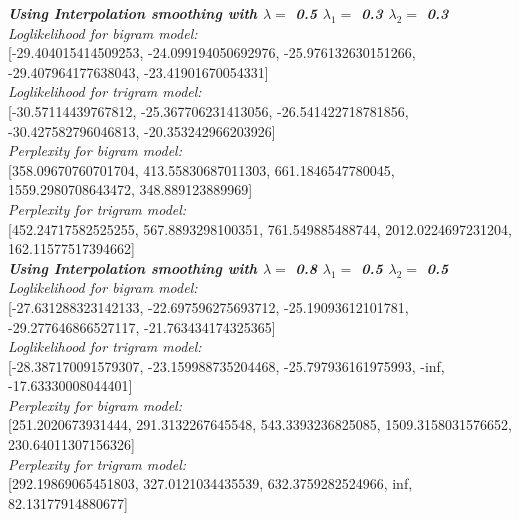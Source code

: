 \documentclass[11ppt]{article}
\begin{document}
\textit{\textbf{Using Interpolation smoothing with $\lambda = $ 0.5 $\lambda_{1} = $ 0.3 $\lambda_{2} = $ 0.3}} \\ \vspace{2mm}
\textit{Loglikelihood for bigram model:} \\ \vspace{1mm}  [-29.404015414509253, -24.099194050692976, -25.976132630151266, -29.407964177638043, -23.41901670054331]  \\ \vspace{2mm}
\textit{Loglikelihood for trigram model:} \\ \vspace{1mm}  [-30.57114439767812, -25.367706231413056, -26.541422718781856, -30.427582796046813, -20.353242966203926]  \\ \vspace{2mm}
\textit{Perplexity for bigram model:} \\ \vspace{1mm}  [358.09670760701704, 413.55830687011303, 661.1846547780045, 1559.2980708643472, 348.889123889969]  \\ \vspace{2mm}
\textit{Perplexity for trigram model:} \\ \vspace{1mm}  [452.24717582525255, 567.8893298100351, 761.549885488744, 2012.0224697231204, 162.11577517394662]  \\ \vspace{2mm}
\textit{\textbf{Using Interpolation smoothing with $\lambda = $ 0.8 $\lambda_{1} = $ 0.5 $\lambda_{2} = $ 0.5}} \\ \vspace{2mm}
\textit{Loglikelihood for bigram model:} \\ \vspace{1mm}  [-27.631288323142133, -22.697596275693712, -25.19093612101781, -29.277646866527117, -21.763434174325365]  \\ \vspace{2mm}
\textit{Loglikelihood for trigram model:} \\ \vspace{1mm}  [-28.387170091579307, -23.159988735204468, -25.797936161975993, -inf, -17.63330008044401]  \\ \vspace{2mm}
\textit{Perplexity for bigram model:} \\ \vspace{1mm}  [251.2020673931444, 291.3132267645548, 543.3393236825085, 1509.3158031576652, 230.64011307156326]  \\ \vspace{2mm}
\textit{Perplexity for trigram model:} \\ \vspace{1mm}  [292.19869065451803, 327.0121034435539, 632.3759282524966, inf, 82.13177914880677]  \\ \vspace{2mm}
\end{document}
